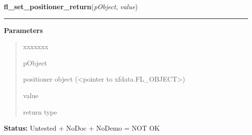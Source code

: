     \label{xformslib:library:fl_set_positioner_return}

    \vspace{0.5ex}

\hspace{.8\funcindent}\begin{boxedminipage}{\funcwidth}

    \raggedright \textbf{fl\_set\_positioner\_return}(\textit{pObject}, \textit{value})

    \vspace{-1.5ex}

    \rule{\textwidth}{0.5\fboxrule}
\setlength{\parskip}{2ex}
\setlength{\parskip}{1ex}
      \textbf{Parameters}
      \vspace{-1ex}

      \begin{quote}
        \begin{Ventry}{xxxxxxx}

          \item[pObject]

          positioner object ({\textless}pointer to 
          xfdata.FL\_OBJECT{\textgreater})

          \item[value]

          return type

        \end{Ventry}

      \end{quote}

\textbf{Status:} Untested + NoDoc + NoDemo = NOT OK



    \end{boxedminipage}

    \label{xformslib:library:fl_add_scrollbar}

    \vspace{0.5ex}

